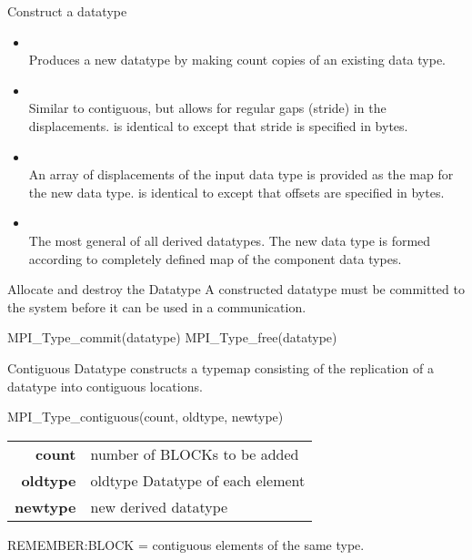 \documentclass[aspectratio=43]{beamer}
\begin{document}
\begin{frame}[fragile]{Construct a datatype}
\begin{itemize}
\item {}\\
Produces a new datatype by making count copies of an existing data type.

\item {}\\
Similar to contiguous, but allows for regular gaps (stride) in the displacements.
 is identical to  except that stride is specified in bytes.

\item {}\\
An array of displacements of the input data type is provided as the map for the new data type.
 is identical to  except that offsets are specified in bytes.

\item {}\\
The most general of all derived datatypes. The new data type is formed according to completely defined map of the component data types.
\end{itemize}

\end{frame}

\begin{frame}[fragile]{Allocate and destroy the Datatype}
A constructed datatype must be committed to the system before it can be used in a communication.\\
\begin{Pseudolisting}[]{}
MPI_Type_commit(datatype)
MPI_Type_free(datatype)
\end{Pseudolisting}
\end{frame}

\begin{frame}[fragile]{Contiguous Datatype}
 constructs a typemap consisting of the replication of a datatype into contiguous locations.
\begin{Pseudolisting}[]{}
MPI_Type_contiguous(count, oldtype, newtype)
\end{Pseudolisting}
\begin{black1block}{}
\begin{tabular}{rp{8cm}}
\textbf{count} & number of BLOCKs to be added\\
\textbf{oldtype} & oldtype Datatype of each element\\
\textbf{newtype} & new derived datatype\\
\end{tabular}
\end{black1block}
REMEMBER:\@ BLOCK = contiguous elements of the same type.
\end{frame}
\end{document}
